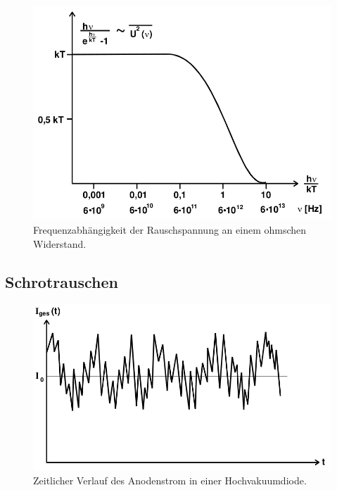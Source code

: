 \begin{figure}[htpb]
  \centering
  \includegraphics[scale=0.3]{bilder/spannungsquadrat.png}
  \caption{Frequenzabhängigkeit der Rauschspannung an einem ohmschen
    Widerstand.}
\label{fig:spannungsquadrat}
\end{figure}


\subsection{Schrotrauschen}
\label{sub:schrotrauschen}

\begin{figure}[htpb]
  \centering
  \includegraphics[scale=0.3]{bilder/diodenstrom.png}
  \caption{Zeitlicher Verlauf des Anodenstrom in einer Hochvakuumdiode.}
\label{fig:diodenstrom}
\end{figure}

